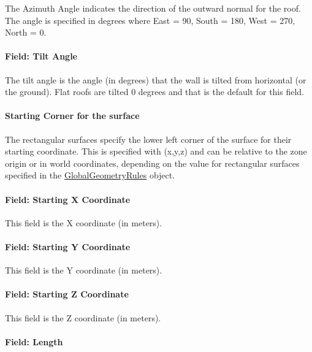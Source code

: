 The Azimuth Angle indicates the direction of the outward normal for the roof. The angle is specified in degrees where East = 90, South = 180, West = 270, North = 0.

\paragraph{Field: Tilt Angle}\label{field-tilt-angle-4}

The tilt angle is the angle (in degrees) that the wall is tilted from horizontal (or the ground). Flat roofs are tilted 0 degrees and that is the default for this field.

\paragraph{Starting Corner for the surface}\label{starting-corner-for-the-surface-4}

The rectangular surfaces specify the lower left corner of the surface for their starting coordinate. This is specified with (x,y,z) and can be relative to the zone origin or in world coordinates, depending on the value for rectangular surfaces specified in the \hyperref[globalgeometryrules]{GlobalGeometryRules} object.

\paragraph{Field: Starting X Coordinate}\label{field-starting-x-coordinate-4}

This field is the X coordinate (in meters).

\paragraph{Field: Starting Y Coordinate}\label{field-starting-y-coordinate-4}

This field is the Y coordinate (in meters).

\paragraph{Field: Starting Z Coordinate}\label{field-starting-z-coordinate-4}

This field is the Z coordinate (in meters).

\paragraph{Field: Length}\label{field-length-4}

